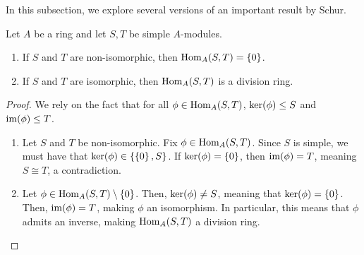 In this subsection, we explore several versions of an important result by Schur.

\begin{theorem}
    Let $A$ be a ring and let $S, T$ be simple $A$-modules.
    \begin{enumerate}[label = \normalfont \arabic*., noitemsep]
        \item If $S$ and $T$ are non-isomorphic, then $\operatorname{Hom}_A(S, T) = \left\{ 0 \right\}$.
        \item If $S$ and $T$ are isomorphic, then $\operatorname{Hom}_A(S,T)$ is a division ring.
    \end{enumerate}
\end{theorem}
\begin{proof}
    We rely on the fact that for all $\phi \in \operatorname{Hom}_A(S, T)$, $\operatorname{ker}\!\left( \phi \right) \leq S$ and $\operatorname{im}\!\left( \phi \right) \leq T$.
    \begin{enumerate}
        \item Let $S$ and $T$ be non-isomorphic. Fix $\phi \in \operatorname{Hom}_A(S,T)$. Since $S$ is simple, we must have that $\operatorname{ker}\!\left( \phi \right) \in \left\{ \left\{ 0 \right\}, S \right\}$. If $\operatorname{ker}\!\left( \phi \right) = \left\{ 0 \right\}$, then $\operatorname{im}\!\left( \phi \right) = T$, meaning $S \cong T$, a contradiction.
        \item Let $\phi \in \operatorname{Hom}_A(S,T) \setminus \left\{ 0 \right\}$. Then, $\operatorname{ker}\!\left( \phi \right) \neq S$, meaning that $\operatorname{ker}\!\left( \phi \right) = \left\{ 0 \right\}$. Then, $\operatorname{im}\!\left( \phi \right) = T$, making $\phi$ an isomorphism. In particular, this means that $\phi$ admits an inverse, making $\operatorname{Hom}_A(S,T)$ a division ring.
    \end{enumerate}
\end{proof}

